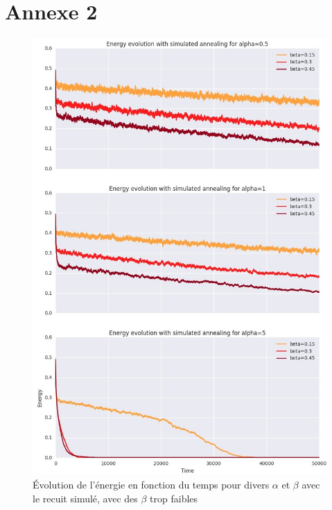 \documentclass[twocolumn]{article}
\begin{document}
\section{Annexe 2}
\begin{figure}[!h]
	\includegraphics[width=\columnwidth]{../tobekept/skype_1.jpg}
	\caption{Évolution de l'énergie en fonction du temps pour divers $\alpha$ et $\beta$ avec le recuit simulé, avec des $\beta$ trop faibles}
\end{figure}
\end{document}

